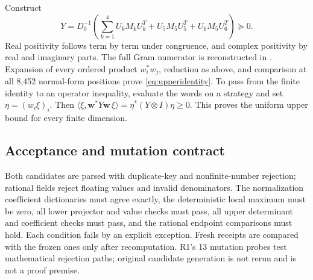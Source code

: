 Construct
\[
 Y=D_0^{-1}\left(\sum_{k=1}^4U_kM_kU_k^T+
                      U_5M_5U_5^T+U_6M_5U_6^T\right)\succeq0 .
\]
Real positivity follows term by term under congruence, and complex
positivity by real and imaginary parts. The full Gram numerator
is reconstructed in .
Expansion of every ordered product \(w_i^*w_j\), reduction as above,
and comparison at all 8,452 normal-form positions prove
\eqref{eq:upperidentity}. To pass from the finite identity to an
operator inequality, evaluate the words on a strategy and set
\(\eta=(w_i\xi)_i\). Then
\(\langle\xi,\mathbf w^*Y\mathbf w\,\xi\rangle
=\eta^*(Y\otimes I)\eta\ge0\).
This proves the uniform upper bound for every finite dimension.

\subsection{Acceptance and mutation contract}
Both candidates are parsed with duplicate-key and nonfinite-number
rejection; rational fields reject floating values and invalid
denominators. The normalization coefficient dictionaries must agree
exactly, the deterministic local maximum must be zero, all lower
projector and value checks must pass, all upper determinant and
coefficient checks must pass, and the rational endpoint comparisons
must hold. Each condition fails by an explicit exception. Fresh
receipts are compared with the frozen ones only after recomputation.
R1's 13 mutation probes test mathematical rejection paths; original
candidate generation is not rerun and is not a proof premise.
